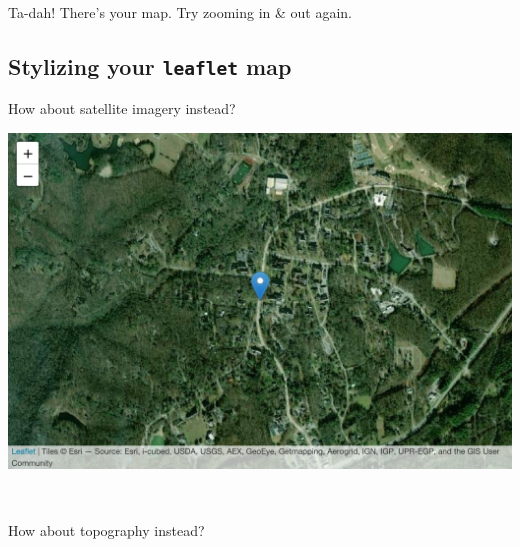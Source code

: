 \documentclass[
]{book}
\newenvironment{Shaded}{\begin{snugshade}}{\end{snugshade}}
\newcommand{\AttributeTok}[1]{\textcolor[rgb]{0.77,0.63,0.00}{#1}}
\newcommand{\FunctionTok}[1]{\textcolor[rgb]{0.00,0.00,0.00}{#1}}
\newcommand{\NormalTok}[1]{#1}
\newcommand{\SpecialCharTok}[1]{\textcolor[rgb]{0.00,0.00,0.00}{#1}}
\begin{document}
~

Ta-dah! There's your map. Try zooming in \& out again.

\hypertarget{stylizing-your-leaflet-map}{%
\subsection*{\texorpdfstring{Stylizing your \texttt{leaflet} map}{Stylizing your leaflet map}}\label{stylizing-your-leaflet-map}}

How about satellite imagery instead?

\begin{Shaded}
\end{Shaded}

\includegraphics[width=694.08px]{figures/unnamed-chunk-223-1}

~

How about topography instead?

\begin{Shaded}
\end{Shaded}
\end{document}
